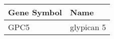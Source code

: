 \begin{tabular}{ll}
\toprule
Gene Symbol &       Name \\
\midrule
       GPC5 & glypican 5 \\
\bottomrule
\end{tabular}
